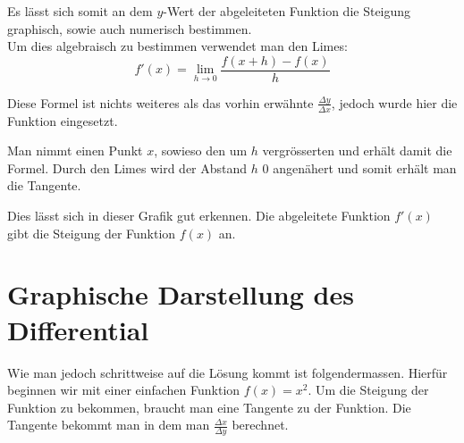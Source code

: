\documentclass[a4paper,11pt]{report}
\begin{document}
Es lässt sich somit an dem $y$-Wert der abgeleiteten Funktion die Steigung graphisch, sowie auch numerisch bestimmen.\\

Um dies algebraisch zu bestimmen verwendet man den Limes:
\begin{equation}
    f'(x) = \lim_{h \to 0} \frac{f(x+h) - f(x)}{h}
\end{equation}

Diese Formel ist nichts weiteres als das vorhin erwähnte $\frac{\Delta y}{\Delta x}$, jedoch wurde hier die Funktion eingesetzt.

Man nimmt einen Punkt $x$, sowieso den um $h$ vergrösserten und erhält damit die Formel. Durch den Limes wird der Abstand $h$ 0 angenähert und somit erhält man die Tangente.
\begin{center}
\end{center}

\noindent Dies lässt sich in dieser Grafik gut erkennen. Die abgeleitete Funktion $f'(x)$ gibt die Steigung der Funktion $f(x)$ an.

\newpage
\section{Graphische Darstellung des Differential}
Wie man jedoch schrittweise auf die Lösung kommt ist folgendermassen. Hierfür beginnen wir mit einer einfachen Funktion $f(x) = x^2$.
Um die Steigung der Funktion zu bekommen, braucht man eine Tangente zu der Funktion. Die Tangente bekommt man in dem man $\frac{\Delta x}{\Delta y}$ berechnet.
\end{document}
